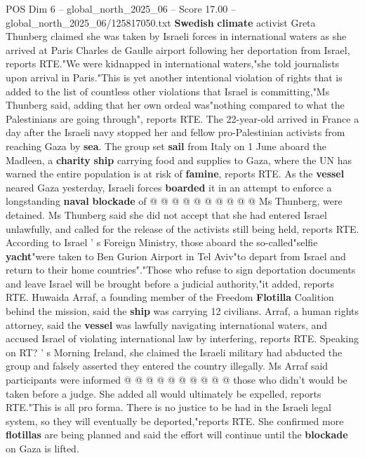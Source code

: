\begin{textsample}{POS Dim 6 – global\_north\_2025\_06 – Score 17.00 – global\_north\_2025\_06/125817050.txt}  \label{ex:f6_pos_027}
\textbf{Swedish} \textbf{climate} activist Greta Thunberg claimed she was taken by Israeli forces in international waters as she arrived at Paris Charles de Gaulle airport following her deportation from Israel, reports RTE."We were kidnapped in international waters,"she told journalists upon arrival in Paris."This is yet another intentional violation of rights that is added to the list of countless other violations that Israel is committing,"Ms Thunberg said, adding that her own ordeal was"nothing compared to what the Palestinians are going through", reports RTE.
The 22-year-old arrived in France a day after the Israeli navy stopped her and fellow pro-Palestinian activists from reaching Gaza by \textbf{sea}.
The group set \textbf{sail} from Italy on 1 June aboard the Madleen, a \textbf{charity} \textbf{ship} carrying food and supplies to Gaza, where the UN has warned the entire population is at risk of \textbf{famine}, reports RTE.
As the \textbf{vessel} neared Gaza yesterday, Israeli forces \textbf{boarded} it in an attempt to enforce a longstanding \textbf{naval} \textbf{blockade} of @ @ @ @ @ @ @ @ @ @ Ms Thunberg, were detained.
Ms Thunberg said she did not accept that she had entered Israel unlawfully, and called for the release of the activists still being held, reports RTE.
According to Israel ' s Foreign Ministry, those aboard the so-called"selfie \textbf{yacht}"were taken to Ben Gurion Airport in Tel Aviv"to depart from Israel and return to their home countries"."Those who refuse to sign deportation documents and leave Israel will be brought before a judicial authority,"it added, reports RTE.
Huwaida Arraf, a founding member of the Freedom \textbf{Flotilla} Coalition behind the mission, said the \textbf{ship} was carrying 12 civilians.
Arraf, a human rights attorney, said the \textbf{vessel} was lawfully navigating international waters, and accused Israel of violating international law by interfering, reports RTE.
Speaking on RT? ' s Morning Ireland, she claimed the Israeli military had abducted the group and falsely asserted they entered the country illegally.
Ms Arraf said participants were informed @ @ @ @ @ @ @ @ @ @ those who didn't would be taken before a judge.
She added all would ultimately be expelled, reports RTE."This is all pro forma.
There is no justice to be had in the Israeli legal system, so they will eventually be deported,"reports RTE.
She confirmed more \textbf{flotillas} are being planned and said the effort will continue until the \textbf{blockade} on Gaza is lifted.

\end{textsample}
